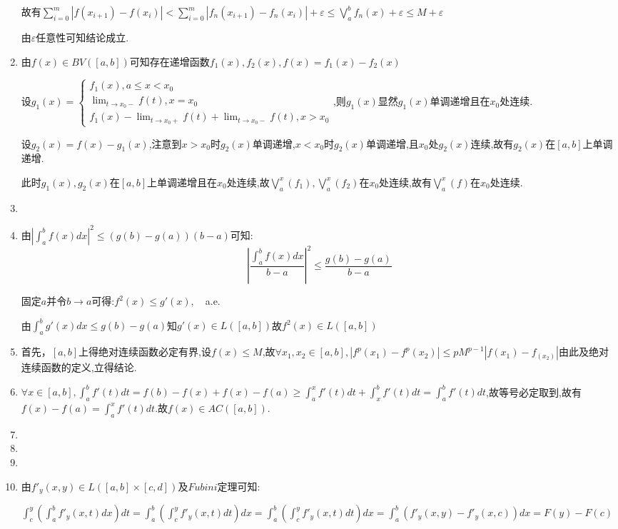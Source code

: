 \documentclass[UTF8, a4paper, 12pt, oneside, onecolumn]{article}
\numberwithin{equation}{section}
\numberwithin{figure}{section}
\numberwithin{table}{section}
\theoremstyle{nonumberplain}	%
\theoremstyle{plain}	%
\theoremstyle{plain}	%
\theoremstyle{plain}	%
\theoremstyle{plain}	%
\theoremstyle{nonumberplain}
\begin{document}
\begin{enumerate}
	故有$\displaystyle\sum_{i=0}^{m}|f(x_{i+1})-f(x_i)|<\sum_{i=0}^{m}|f_n(x_{i+1})-f_n(x_i)|+\varepsilon\leqslant\bigvee_{a}^{b}f_n(x)+\varepsilon\leqslant M+\varepsilon$
	
	由$\varepsilon$任意性可知结论成立.
	\item 由$f(x)\in BV([a,b])$可知存在递增函数$f_1(x),f_2(x),f(x)=f_1(x)-f_2(x)$
	
	设$\displaystyle g_1(x)=\left\{\begin{array}{c}\displaystyle
	f_1(x),a\leqslant x<x_0\\
	\displaystyle\lim_{t\rightarrow x_0-}f(t),x=x_0\\
	\displaystyle f_1(x)-\lim_{t\rightarrow x_0+}f(t)+\lim_{t\rightarrow x_0-}f(t),x>x_0
	\end{array}\right.$,则$g_1(x)$显然$g_1(x)$单调递增且在$x_0$处连续.
	
	设$g_2(x)=f(x)-g_1(x)$,注意到$x>x_0$时$g_2(x)$单调递增,$x<x_0$时$g_2(x)$单调递增,且$x_0$处$g_2(x)$连续,故有$g_2(x)$在$[a,b]$上单调递增.
	
	此时$g_1(x),g_2(x)$在$[a,b]$上单调递增且在$x_0$处连续,故$\displaystyle\bigvee_{a}^{x}(f_1),\bigvee_{a}^{x}(f_2)$在$x_0$处连续,故有$\displaystyle\bigvee_{a}^{x}(f)$在$x_0$处连续.
	\item
	\item 由$\displaystyle|\int_{a}^{b}f(x)dx|^2\leqslant (g(b)-g(a)  )(b-a)$可知:
	$$\displaystyle|\frac{\int_{a}^{b}f(x)dx}{b-a}|^2\leqslant \frac{g(b)-g(a)}{b-a}$$
	
	固定$a$并令$b\rightarrow a$可得:$f^2(x)\leqslant g'(x),$~~a.e.
	
	由$\int_{a}^{b}g'(x)dx\leqslant g(b)-g(a)$知$g'(x)\in L([a,b])$故$f^2(x)\in L([a,b
	])$
	\item 首先，$[a,b]$上得绝对连续函数必定有界,设$f(x)\leqslant M$,故$\forall x_1,x_2\in [a,b],|f^p(x_1)-f^p(x_2)|\leqslant pM^{p-1}|f(x_1)-f_(x_2)|$由此及绝对连续函数的定义,立得结论.
	\item $\displaystyle\forall x\in [a,b],\int_{a}^{b}f'(t)dt=f(b)-f(x)+f(x)-f(a)\geqslant\int_{a}^{x}f'(t)dt+\int_{x}^{b}f'(t)dt=\int_{a}^{b}f'(t)dt$,故等号必定取到,故有$\displaystyle f(x)-f(a)=\int_{a}^{x}f'(t)dt$.故$f(x)\in AC([a,b])$.
	\item
	\item
	\item
	\item 由$f'_y(x,y)\in L([a,b]\times[c,d])$及$Fubini$定理可知:
	
	$\displaystyle\int_{c}^{y}(\int_a^b f'_y(x,t)dx )dt=\int_a^b(\int_{c}^{y} f'_y(x,t)dt )dx=\int_a^b(\int_{c}^{y} f'_y(x,t)dt )dx=\int_a^b (f'_y(x,y)-f'_y(x,c) )dx=F(y)-F(c)$
	

\end{enumerate}
\end{document}
